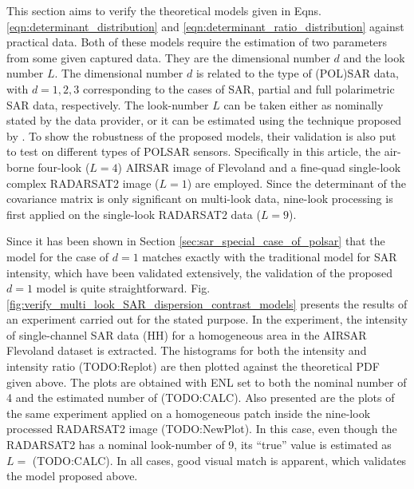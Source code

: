 \documentclass[journal]{IEEEtran}
\begin{document}
This section aims to verify the theoretical models given in Eqns. \ref{eqn:determinant_distribution} and \ref {eqn:determinant_ratio_distribution} against practical data.
Both of these models require the estimation of two parameters from some given captured data.
They are the dimensional number $d$ and the look number $L$.
The dimensional number $d$ is related to the type of (POL)SAR data,
  with $d=1,2,3$ corresponding to the cases of SAR, partial and full polarimetric SAR data, respectively.
The look-number $L$ can be taken either as nominally stated by the data provider,
  or it can be estimated using the technique proposed by \cite{Anfinsen_2009_TGRS_3795}.
To show the robustness of the proposed models, their validation is also put to test on different types of POLSAR sensors.
Specifically in this article, the air-borne four-look ($L=4$) AIRSAR image of Flevoland and
  a fine-quad single-look complex RADARSAT2 image ($L=1$) are employed.
Since the determinant of the covariance matrix is only significant on multi-look data,
  nine-look processing is first applied on the single-look RADARSAT2 data ($L=9$).

Since it has been shown in Section \ref{sec:sar_special_case_of_polsar} that the model for the case of $d=1$ matches exactly with the traditional model for SAR intensity,
  which have been validated extensively, the validation of the proposed $d=1$ model is quite straightforward. %
Fig. \ref{fig:verify_multi_look_SAR_dispersion_contrast_models} presents the results of an experiment carried out for the stated purpose.
In the experiment, the intensity of single-channel SAR data (HH) for a homogeneous area in the AIRSAR Flevoland dataset is extracted.
The histograms for both the intensity and intensity ratio (TODO:Replot) %
  are then plotted against the theoretical PDF given above.
The plots are obtained with ENL set to both the nominal number of 4 and the estimated number of (TODO:CALC).
Also presented are the plots of the same experiment applied on a homogeneous patch inside the nine-look processed RADARSAT2 image (TODO:NewPlot).
In this case, even though the RADARSAT2 has a nominal look-number of 9, its ``true'' value is estimated as $L=$ (TODO:CALC).
In all cases, good visual match is apparent, which validates the model proposed above. %
\end{document}
